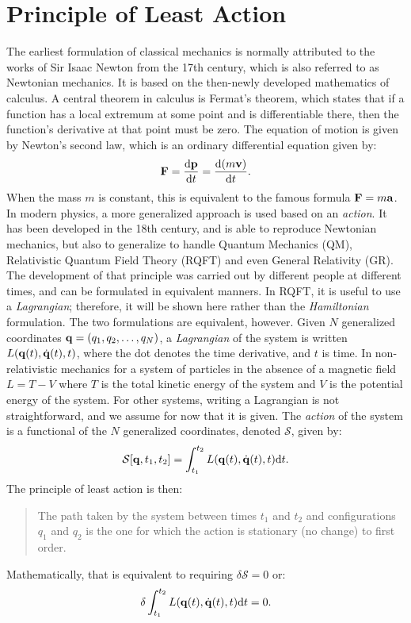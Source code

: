 \section{Principle of Least Action}
\label{sec:least-action}
The earliest formulation of classical mechanics is normally attributed to the works of Sir Isaac Newton from the 17th century, which is also referred to as Newtonian mechanics. It is based on the then-newly developed mathematics of calculus. A central theorem in calculus is Fermat's theorem, which states that if a function has a local extremum at some point and is differentiable there, then the function's derivative at that point must be zero. The equation of motion is given by Newton's second law, which is an ordinary differential equation given by:
\begin{equation}
\vb{F}=\dv{\vb{p}}{t}=\dv{(m\vb{v})}{t}.
\label{eq:newton-second-law}
\end{equation}
When the mass $m$ is constant, this is equivalent to the famous formula $\vb{F}=m\vb{a}$. In modern physics, a more generalized approach is used based on an \emph{action}. It has been developed in the 18th century, and is able to reproduce Newtonian mechanics, but also to generalize to handle Quantum Mechanics (QM), Relativistic Quantum Field Theory (RQFT) and even General Relativity (GR). The development of that principle was carried out by different people at different times, and can be formulated in equivalent manners. In RQFT, it is useful to use a \emph{Lagrangian}; therefore, it will be shown here rather than the \emph{Hamiltonian} formulation. The two formulations are equivalent, however. Given $N$ generalized coordinates $\vb{q}=\qty(q_1,q_2,\ldots,q_N)$, a \emph{Lagrangian} of the system is written $L\qty( \vb{q}\qty(t), \dot{\vb{q}}\qty(t), t )$, where the dot denotes the time derivative, and $t$ is time. In non-relativistic mechanics for a system of particles in the absence of a magnetic field  $L=T-V$ where $T$ is the total kinetic energy of the system and $V$ is the potential energy of the system. For other systems, writing a Lagrangian is not straightforward, and we assume for now that it is given. The \emph{action} of the system is a functional of the $N$ generalized coordinates, denoted $\mathcal{S}$, given by:
\begin{equation}
\mathcal{S}\qty[ \vb{q}, t_1, t_2 ] = \int^{t_2}_{t_1} L\qty( \vb{q}\qty(t), \dot{\vb{q}}\qty(t), t ) \dd t.
\end{equation}
The principle of least action is then:
\begin{quote}
The path taken by the system between times $t_1$ and $t_2$ and configurations $q_1$ and $q_2$ is the one for which the action is stationary (no change) to first order.
\end{quote}
Mathematically, that is equivalent to requiring $\delta \mathcal{S}=0$ or:
\begin{equation}
\delta \int^{t_2}_{t_1} L\qty( \vb{q}\qty(t), \dot{\vb{q}}\qty(t), t ) \dd t = 0.
\label{eq:principle-of-least-action}
\end{equation}

